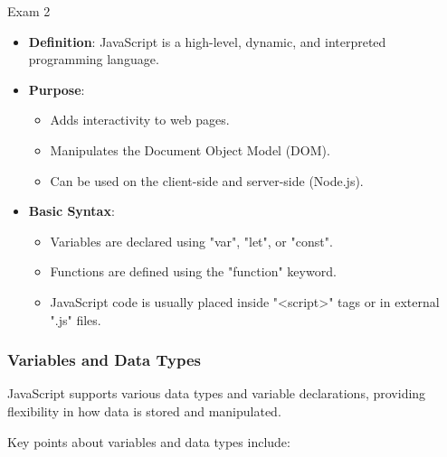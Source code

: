 \begin{examnotes}{Exam 2}
\begin{highlight}
        \begin{itemize}
            \item \textbf{Definition}: JavaScript is a high-level, dynamic, and interpreted programming language.
            \item \textbf{Purpose}:
                \begin{itemize}
                    \item Adds interactivity to web pages.
                    \item Manipulates the Document Object Model (DOM).
                    \item Can be used on the client-side and server-side (Node.js).
                \end{itemize}
            \item \textbf{Basic Syntax}:
                \begin{itemize}
                    \item Variables are declared using "var", "let", or "const".
                    \item Functions are defined using the "function" keyword.
                    \item JavaScript code is usually placed inside "<script>" tags or in external ".js" files.
                \end{itemize}
        \end{itemize}
    \end{highlight}
    
    \subsubsection*{Variables and Data Types}
    
    JavaScript supports various data types and variable declarations, providing flexibility in how data is stored and manipulated.
    
    \begin{highlight}
        Key points about variables and data types include:
        

\end{highlight}
\end{examnotes}
